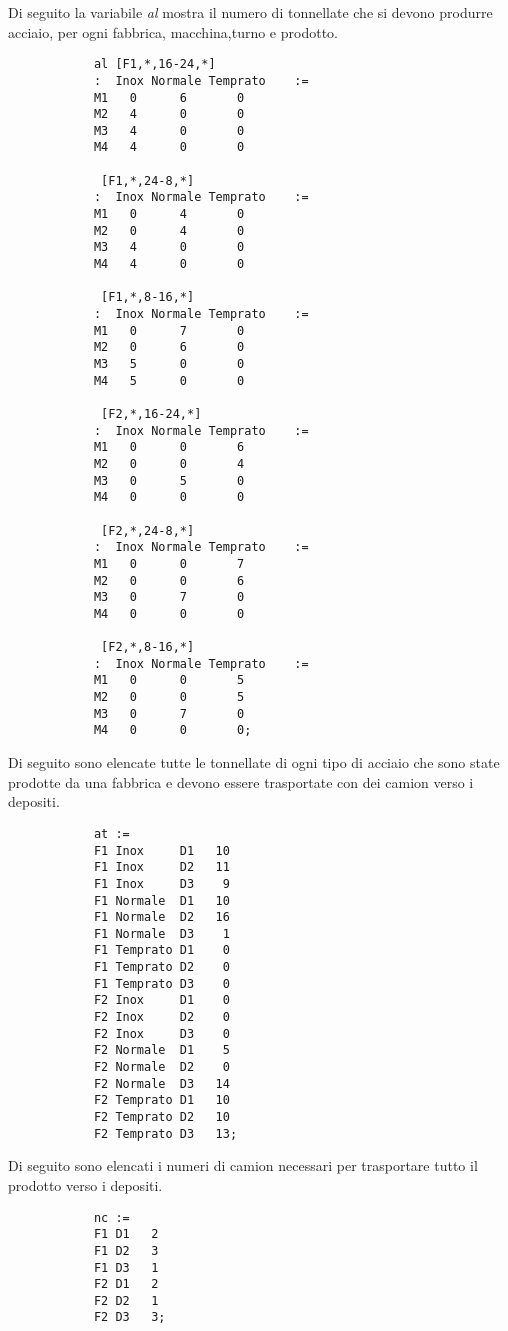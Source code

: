 \documentclass[12pt]{article} %
\begin{document}
		Di seguito la variabile \textit{al} mostra il numero di tonnellate che si devono produrre acciaio, per ogni fabbrica,  macchina,turno e prodotto. 
		\begin{lstlisting}
			al [F1,*,16-24,*]
			:  Inox Normale Temprato    :=
			M1   0      6       0
			M2   4      0       0
			M3   4      0       0
			M4   4      0       0

			 [F1,*,24-8,*]
			:  Inox Normale Temprato    :=
			M1   0      4       0
			M2   0      4       0
			M3   4      0       0
			M4   4      0       0

			 [F1,*,8-16,*]
			:  Inox Normale Temprato    :=
			M1   0      7       0
			M2   0      6       0
			M3   5      0       0
			M4   5      0       0

			 [F2,*,16-24,*]
			:  Inox Normale Temprato    :=
			M1   0      0       6
			M2   0      0       4
			M3   0      5       0
			M4   0      0       0

			 [F2,*,24-8,*]
			:  Inox Normale Temprato    :=
			M1   0      0       7
			M2   0      0       6
			M3   0      7       0
			M4   0      0       0

			 [F2,*,8-16,*]
			:  Inox Normale Temprato    :=
			M1   0      0       5
			M2   0      0       5
			M3   0      7       0
			M4   0      0       0;
		\end{lstlisting}

		Di seguito sono elencate tutte le tonnellate di ogni tipo di acciaio che sono state prodotte da una fabbrica e devono essere trasportate con dei camion verso i depositi.
		\begin{lstlisting}
			at :=
			F1 Inox     D1   10
			F1 Inox     D2   11
			F1 Inox     D3    9
			F1 Normale  D1   10
			F1 Normale  D2   16
			F1 Normale  D3    1
			F1 Temprato D1    0
			F1 Temprato D2    0
			F1 Temprato D3    0
			F2 Inox     D1    0
			F2 Inox     D2    0
			F2 Inox     D3    0
			F2 Normale  D1    5
			F2 Normale  D2    0
			F2 Normale  D3   14
			F2 Temprato D1   10
			F2 Temprato D2   10
			F2 Temprato D3   13;
		\end{lstlisting}

		Di seguito sono elencati i numeri di camion necessari per trasportare tutto il prodotto verso i depositi.
		\begin{lstlisting}
			nc :=
			F1 D1   2
			F1 D2   3
			F1 D3   1
			F2 D1   2
			F2 D2   1
			F2 D3   3;
		\end{lstlisting}
\end{document}
